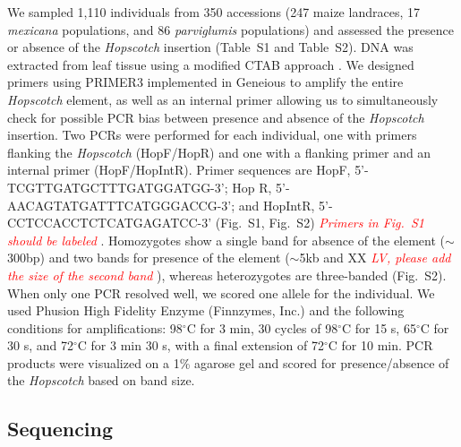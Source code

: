 \documentclass[11pt]{article}
\newcommand{\mbh}[1]{\textcolor{red}{ \emph{\scriptsize  #1}} }
\begin{document}
\begin{linenumbers}
\begin{flushleft}
We sampled 1,110 individuals from 350 accessions (247 maize landraces, 17 \emph{mexicana} populations, and 86 \emph{parviglumis} populations) and assessed the presence or absence of the \emph{Hopscotch} insertion (Table~S1 and Table~S2). DNA was extracted from leaf tissue using a modified CTAB approach \citep{DoyleDoyle1990, Maloof1984}. We designed primers using PRIMER3 \citep{RozenSkaletsky2000} implemented in Geneious \citep{Kearse2012} to amplify the entire \emph{Hopscotch} element, as well as an internal primer allowing us to simultaneously check for possible PCR bias between presence and absence of the \emph{Hopscotch} insertion. Two PCRs were performed for each individual, one with primers flanking the \emph{Hopscotch} (HopF/HopR) and one with a flanking primer and an internal primer (HopF/HopIntR). Primer sequences are HopF, {\small 5'-TCGTTGATGCTTTGATGGATGG-3'}; 
Hop R, {\small 5'-AACAGTATGATTTCATGGGACCG-3'}; and HopIntR, {\small  5'-CCTCCACCTCTCATGAGATCC-3'} (Fig.~S1, Fig.~S2) \mbh{Primers in Fig.~S1 should be labeled}. Homozygotes show a single band for absence of the element ($\sim$300bp) and two bands for presence of the element ($\sim$5kb and XX \mbh{LV, please add the size of the second band}), whereas heterozygotes are three-banded (Fig.~S2). When only one PCR resolved well, we scored one allele for the individual. We used Phusion High Fidelity Enzyme (Finnzymes, Inc.) and the following conditions for amplifications: 98$^{\circ}$C for 3 min, 30 cycles of 98$^{\circ}$C for 15 s, 65$^{\circ}$C for 30 s, and 72$^{\circ}$C for 3 min 30 s, with a final extension of 72$^{\circ}$C for 10 min. PCR products were visualized on a 1\% agarose gel and scored for presence/absence of the \emph{Hopscotch} based on band size.

\subsection*{Sequencing}


\end{flushleft}
\end{linenumbers}
\end{document}
